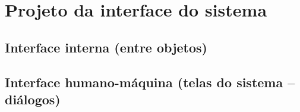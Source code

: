 \section{Projeto da interface do sistema}
\subsection{Interface interna (entre objetos)}

\subsection{Interface humano-máquina (telas do sistema -- diálogos)}

